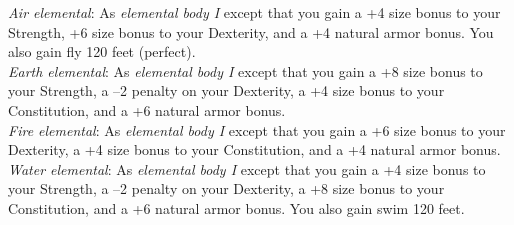 \textit{Air elemental}: As \textit{elemental body I} except that you gain a +4 size bonus to your Strength, +6 size bonus to your Dexterity, and a +4 natural armor bonus. You also gain fly 120 feet (perfect).\\
\textit{Earth elemental}: As \textit{elemental body I} except that you gain a +8 size bonus to your Strength, a –2 penalty on your Dexterity, a +4 size bonus to your Constitution, and a +6 natural armor bonus. \\
\textit{Fire elemental}: As \textit{elemental body I} except that you gain a +6 size bonus to your Dexterity, a +4 size bonus to your Constitution, and a +4 natural armor bonus.\\
\textit{Water elemental}: As \textit{elemental body I} except that you gain a +4 size bonus to your Strength, a –2 penalty on your Dexterity, a +8 size bonus to your Constitution, and a +6 natural armor bonus. You also gain swim 120 feet.\\
